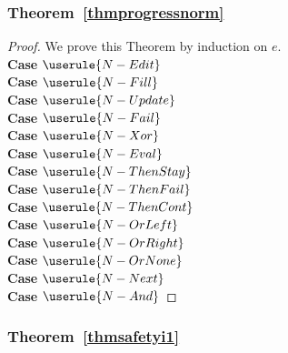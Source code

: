 \subsubsection{Theorem~\ref{thmprogressnorm}}

\begin{proof} We prove this Theorem by induction on $e$.\\

  \noindent\textbf{Case} $\userule{N-Edit}$ \\

  \noindent\textbf{Case} $\userule{N-Fill}$ \\

  \noindent\textbf{Case} $\userule{N-Update}$ \\

  \noindent\textbf{Case} $\userule{N-Fail}$ \\

  \noindent\textbf{Case} $\userule{N-Xor}$ \\

  \noindent\textbf{Case} $\userule{N-Eval}$ \\

  \noindent\textbf{Case} $\userule{N-ThenStay}$ \\

  \noindent\textbf{Case} $\userule{N-ThenFail}$ \\

  \noindent\textbf{Case} $\userule{N-ThenCont}$ \\

  \noindent\textbf{Case} $\userule{N-OrLeft}$ \\

  \noindent\textbf{Case} $\userule{N-OrRight}$ \\

  \noindent\textbf{Case} $\userule{N-OrNone}$ \\

  \noindent\textbf{Case} $\userule{N-Next}$ \\

  \noindent\textbf{Case} $\userule{N-And}$

\end{proof}

\subsubsection{Theorem~\ref{thmsafetyi1}}

